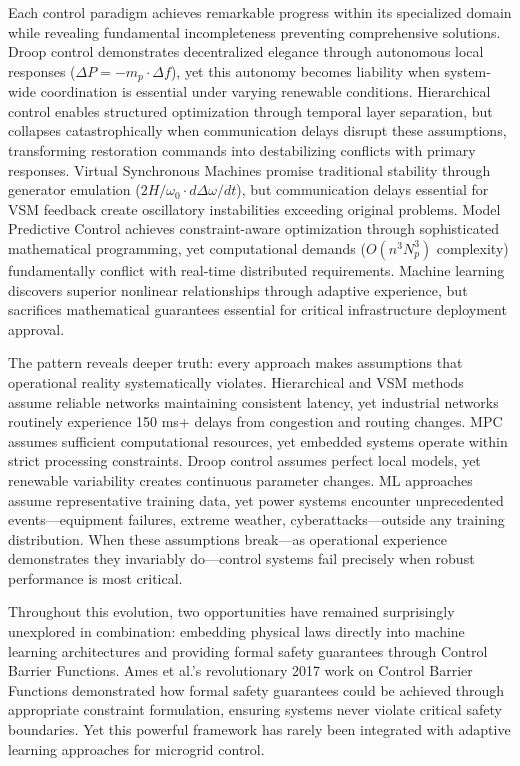 \documentclass[12pt]{article}
\begin{document}
Each control paradigm achieves remarkable progress within its specialized domain while revealing fundamental incompleteness preventing comprehensive solutions. Droop control demonstrates decentralized elegance through autonomous local responses ($\Delta P = -m_p \cdot \Delta f$), yet this autonomy becomes liability when system-wide coordination is essential under varying renewable conditions. Hierarchical control enables structured optimization through temporal layer separation, but collapses catastrophically when communication delays disrupt these assumptions, transforming restoration commands into destabilizing conflicts with primary responses. Virtual Synchronous Machines promise traditional stability through generator emulation ($2H/\omega_0 \cdot d\Delta\omega/dt$), but communication delays essential for VSM feedback create oscillatory instabilities exceeding original problems. Model Predictive Control achieves constraint-aware optimization through sophisticated mathematical programming, yet computational demands ($O(n^3 N_p^3)$ complexity) fundamentally conflict with real-time distributed requirements. Machine learning discovers superior nonlinear relationships through adaptive experience, but sacrifices mathematical guarantees essential for critical infrastructure deployment approval.

The pattern reveals deeper truth: every approach makes assumptions that operational reality systematically violates. Hierarchical and VSM methods assume reliable networks maintaining consistent latency, yet industrial networks routinely experience 150 ms+ delays from congestion and routing changes. MPC assumes sufficient computational resources, yet embedded systems operate within strict processing constraints. Droop control assumes perfect local models, yet renewable variability creates continuous parameter changes. ML approaches assume representative training data, yet power systems encounter unprecedented events---equipment failures, extreme weather, cyberattacks---outside any training distribution. When these assumptions break---as operational experience demonstrates they invariably do---control systems fail precisely when robust performance is most critical.

Throughout this evolution, two opportunities have remained surprisingly unexplored in combination: embedding physical laws directly into machine learning architectures and providing formal safety guarantees through Control Barrier Functions. Ames et al.'s revolutionary 2017 work \cite{ames2017} on Control Barrier Functions demonstrated how formal safety guarantees could be achieved through appropriate constraint formulation, ensuring systems never violate critical safety boundaries. Yet this powerful framework has rarely been integrated with adaptive learning approaches for microgrid control.
\end{document}
